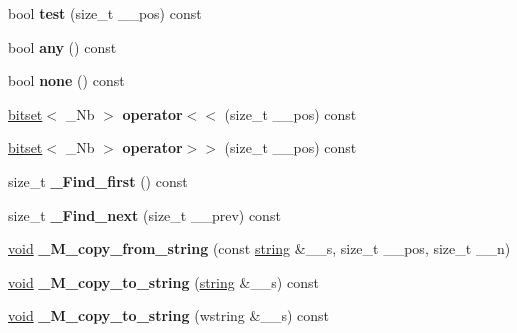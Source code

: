 \begin{DoxyCompactItemize}
\mbox{\label{classbitset_ae1dfad1595f258ceea306419a589a3b6}} 
bool {\bfseries test} (size\+\_\+t \+\_\+\+\_\+pos) const
\item 
\mbox{\label{classbitset_adb7341cc898b2fc1e153485e552418bf}} 
bool {\bfseries any} () const
\item 
\mbox{\label{classbitset_a7080ceb9d0e6c9c5fbbc47d7b34e92c7}} 
bool {\bfseries none} () const
\item 
\mbox{\label{classbitset_a190b26cb878f21df3b661ff9c72ef18b}} 
\hyperlink{classbitset}{bitset}$<$ \+\_\+\+Nb $>$ {\bfseries operator$<$$<$} (size\+\_\+t \+\_\+\+\_\+pos) const
\item 
\mbox{\label{classbitset_a217e7d3c3384b23f316455542ef84d7d}} 
\hyperlink{classbitset}{bitset}$<$ \+\_\+\+Nb $>$ {\bfseries operator$>$$>$} (size\+\_\+t \+\_\+\+\_\+pos) const
\item 
\mbox{\label{classbitset_aa232225a7a397ffadbe7009886264740}} 
size\+\_\+t {\bfseries \+\_\+\+Find\+\_\+first} () const
\item 
\mbox{\label{classbitset_a1151d56087ceec1dbf9a01eb62f7e356}} 
size\+\_\+t {\bfseries \+\_\+\+Find\+\_\+next} (size\+\_\+t \+\_\+\+\_\+prev) const
\item 
\mbox{\label{classbitset_a3763fca1d84963da00da10d8eb30e8a9}} 
\hyperlink{interfacevoid}{void} {\bfseries \+\_\+\+M\+\_\+copy\+\_\+from\+\_\+string} (const \hyperlink{structstring}{string} \&\+\_\+\+\_\+s, size\+\_\+t \+\_\+\+\_\+pos, size\+\_\+t \+\_\+\+\_\+n)
\item 
\mbox{\label{classbitset_a8eb6b66f9b8ce6adff6f543dec7c6e9a}} 
\hyperlink{interfacevoid}{void} {\bfseries \+\_\+\+M\+\_\+copy\+\_\+to\+\_\+string} (\hyperlink{structstring}{string} \&\+\_\+\+\_\+s) const
\item 
\mbox{\label{classbitset_a9fb5d27d12db1afecbd3ec19ea620648}} 
\hyperlink{interfacevoid}{void} {\bfseries \+\_\+\+M\+\_\+copy\+\_\+to\+\_\+string} (wstring \&\+\_\+\+\_\+s) const
\end{DoxyCompactItemize}
